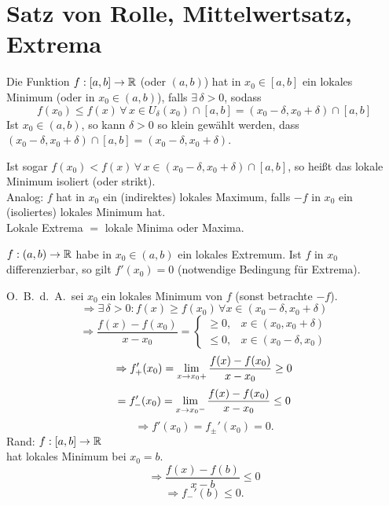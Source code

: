 \documentclass[../ana1.tex]{subfiles}
\begin{document}
\setcounter{section}{18}
\section{Satz von Rolle, Mittelwertsatz, Extrema}
\begin{defi}
    Die Funktion \( f : [a,b] \rightarrow \mathbb{R} \) (oder \( (a,b) \))
    hat in \( x_0 \in [a,b] \) ein lokales Minimum (oder in 
    \( x_0 \in (a,b) \)), falls \( \exists \, \delta > 0 \), 
    sodass 
    \[ f(x_0) \leq f(x) \, \forall \, x \in U_\delta(x_0)
    \cap [a,b] = (x_0 - \delta, x_0 + \delta) \cap [a,b] \]
    Ist \( x_0 \in (a,b) \), so kann \( \delta > 0 \) so klein 
    gewählt werden, dass \( (x_0 - \delta, x_0 + \delta) 
    \cap [a,b] = (x_0 - \delta, x_0 + \delta) \).
    \begin{center}
    \end{center}
    Ist sogar \( f(x_0) < f(x) \,\forall \, x \in 
    (x_0 - \delta, x_0 + \delta) \cap [a,b] \), so heißt 
    das lokale Minimum isoliert (oder strikt).\\
    Analog: \( f \) hat in \( x_0 \) ein (indirektes) lokales 
    Maximum, falls \(-f\) in \(x_0\) ein (isoliertes) lokales 
    Minimum hat.\\
    Lokale Extrema \(=\) lokale Minima oder Maxima.
\end{defi}
\begin{satz}
    \( f: (a,b) \rightarrow \mathbb{R} \) habe in \(x_0 \in (a,b) \) 
    ein lokales Extremum. Ist \(f\) in \(x_0\) differenzierbar, 
    so gilt \( f'(x_0) = 0 \) (notwendige Bedingung für Extrema).
\end{satz}
\begin{bew}
    O.\ B.\ d.\ A.\ sei \(x_0\) ein lokales Minimum von \(f\) 
    (sonst betrachte \(-f\)).
    \[ \Rightarrow \exists \, \delta > 0 : f(x) \geq f(x_0) 
    \,\forall x \in (x_0 - \delta, x_0 + \delta) \]
    \[ \Rightarrow \frac{f(x) - f(x_0)}{x - x_0} = \begin{cases}
        \geq 0, &x \in (x_0, x_0 + \delta)\\
        \leq 0, &x \in (x_0 - \delta, x_0)
    \end{cases} \]
    \[ \Rightarrow f_+'(x_0) = \lim\limits_{x\rightarrow x_0 +} 
    \frac{ f(x) - f(x_0) }{ x - x_0 } \geq 0 \]
    \[ = f_{\minus}'(x_0) = \limesx{x}{x_0 \minus} 
    \frac{ f(x) - f(x_0) }{ x - x_0 } \leq 0 \]
    \[ \Rightarrow f'(x_0) = f_{\pm}'(x_0) = 0. \]
    Rand: \(f: [a,b] \rightarrow \mathbb{R} \) \\
    hat lokales Minimum bei \( x_0 = b \).
    \[ \Rightarrow \frac{ f(x) - f(b) }{ x - b } \leq 0 \]
    \[ \Rightarrow f_{\minus}'(b) \leq 0. \]
\end{bew}
\end{document}

